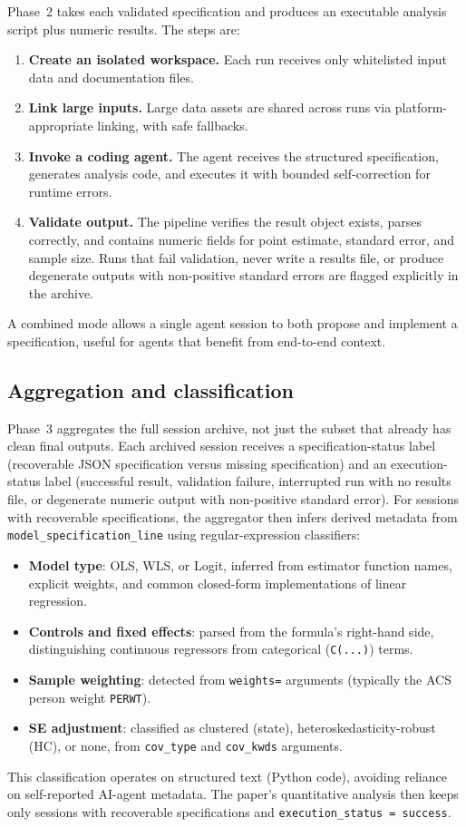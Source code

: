 \documentclass[12pt]{article}
\begin{document}
Phase~2 takes each validated specification and produces an executable analysis script plus numeric results. The steps are:
\begin{enumerate}
\item \textbf{Create an isolated workspace.} Each run receives only whitelisted input data and documentation files.
\item \textbf{Link large inputs.} Large data assets are shared across runs via platform-appropriate linking, with safe fallbacks.
\item \textbf{Invoke a coding agent.} The agent receives the structured specification, generates analysis code, and executes it with bounded self-correction for runtime errors.
\item \textbf{Validate output.} The pipeline verifies the result object exists, parses correctly, and contains numeric fields for point estimate, standard error, and sample size. Runs that fail validation, never write a results file, or produce degenerate outputs with non-positive standard errors are flagged explicitly in the archive.
\end{enumerate}
A combined mode allows a single agent session to both propose and implement a specification, useful for agents that benefit from end-to-end context.

\subsection*{Aggregation and classification}

Phase~3 aggregates the full session archive, not just the subset that already has clean final outputs. Each archived session receives a specification-status label (recoverable JSON specification versus missing specification) and an execution-status label (successful result, validation failure, interrupted run with no results file, or degenerate numeric output with non-positive standard error). For sessions with recoverable specifications, the aggregator then infers derived metadata from \texttt{model\_specification\_line} using regular-expression classifiers:
\begin{itemize}
\item \textbf{Model type}: OLS, WLS, or Logit, inferred from estimator function names, explicit weights, and common closed-form implementations of linear regression.
\item \textbf{Controls and fixed effects}: parsed from the formula's right-hand side, distinguishing continuous regressors from categorical (\texttt{C(...)}) terms.
\item \textbf{Sample weighting}: detected from \texttt{weights=} arguments (typically the ACS person weight \texttt{PERWT}).
\item \textbf{SE adjustment}: classified as clustered (state), heteroskedasticity-robust (HC), or none, from \texttt{cov\_type} and \texttt{cov\_kwds} arguments.
\end{itemize}
This classification operates on structured text (Python code), avoiding reliance on self-reported AI-agent metadata. The paper's quantitative analysis then keeps only sessions with recoverable specifications and \texttt{execution\_status = success}.
\end{document}
